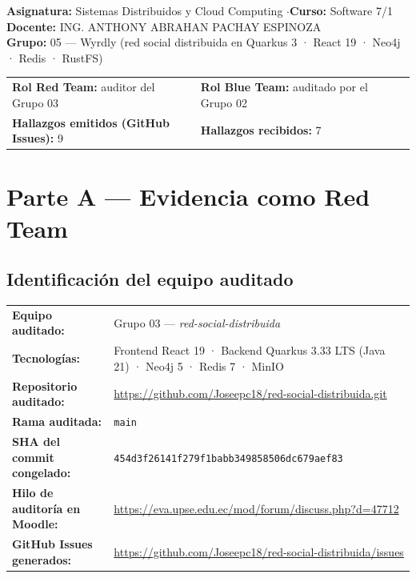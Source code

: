 \documentclass[10pt,a4paper]{article}
\newcommand{\code}[1]{\nolinkurl{#1}}
\begin{document}
\begin{tcolorbox}[colback=lightgray!50,colframe=upseblue!35,arc=2mm]
\small
\textbf{Asignatura:} Sistemas Distribuidos y Cloud Computing \quad$\cdot$\quad \textbf{Curso:} Software 7/1\\
\textbf{Docente:} ING. ANTHONY ABRAHAN PACHAY ESPINOZA\\
\textbf{Grupo:} 05 — Wyrdly (red social distribuida en Quarkus 3 · React 19 · Neo4j · Redis · RustFS)\\[0.2cm]
\begin{tabular}{@{}ll@{\qquad}ll@{}}
\textbf{Rol Red Team:} auditor del Grupo 03 &
\textbf{Rol Blue Team:} auditado por el Grupo 02 \\
\textbf{Hallazgos emitidos (GitHub Issues):} 9 &
\textbf{Hallazgos recibidos:} 7 \\
\end{tabular}
\end{tcolorbox}
\vspace{1em}

\section{\textcolor{redteamcolor}{Parte A — Evidencia como Red Team}}

\subsection{Identificación del equipo auditado}

\begin{tcolorbox}[colback=red!4,colframe=redteamcolor!40,arc=2mm]
\begin{tabular}{@{}p{4cm}p{10.5cm}@{}}
\textbf{Equipo auditado:} & Grupo 03 — \textit{red-social-distribuida} \\
\textbf{Tecnologías:} & Frontend React 19 · Backend Quarkus 3.33 LTS (Java 21) · Neo4j 5 · Redis 7 · MinIO \\
\textbf{Repositorio auditado:} & \url{https://github.com/Joseepc18/red-social-distribuida.git} \\
\textbf{Rama auditada:} & \code{main} \\
\textbf{SHA del commit congelado:} & \code{454d3f26141f279f1babb349858506dc679aef83} \\
\textbf{Hilo de auditoría en Moodle:} & \url{https://eva.upse.edu.ec/mod/forum/discuss.php?d=47712} \\
\textbf{GitHub Issues generados:} & \url{https://github.com/Joseepc18/red-social-distribuida/issues} \\
\end{tabular}
\end{tcolorbox}
\end{document}
